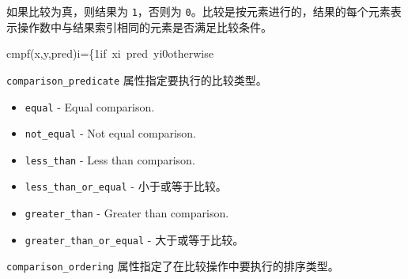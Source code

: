 \documentclass{article}
\begin{document}
如果比较为真，则结果为 \texttt{1}，否则为 \texttt{0}。比较是按元素进行的，结果的每个元素表示操作数中与结果索引相同的元素是否满足比较条件。


cmpf(x,y,pred)i=\{1if xi pred yi0otherwise

\texttt{comparison\_predicate} 属性指定要执行的比较类型。


\begin{itemize}
\item \texttt{equal} - Equal comparison.
\item \texttt{not\_equal} - Not equal comparison.
\item \texttt{less\_than} - Less than comparison.
\item \texttt{less\_than\_or\_equal} - 小于或等于比较。
\item \texttt{greater\_than} - Greater than comparison.
\item \texttt{greater\_than\_or\_equal} - 大于或等于比较。

\end{itemize}
\texttt{comparison\_ordering} 属性指定了在比较操作中要执行的排序类型。
\end{document}
